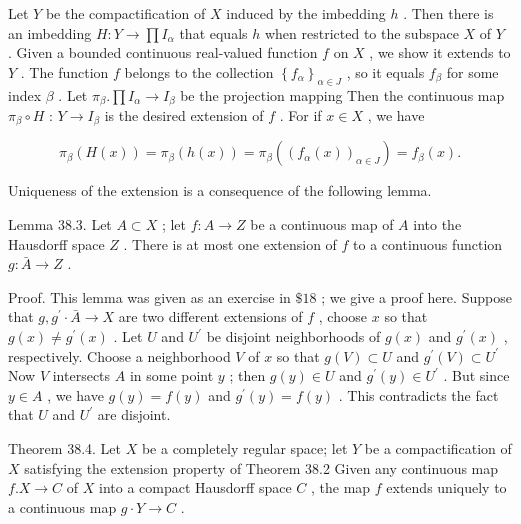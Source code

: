 Let \(Y\) be the compactification of \(X\) induced by the imbedding \(h\) . Then there is an imbedding \(H : Y \rightarrow  \prod {I}_{\alpha }\) that equals \(h\) when restricted to the subspace \(X\) of \(Y\) . Given a bounded continuous real-valued function \(f\) on \(X\) , we show it extends to \(Y\) . The function \(f\) belongs to the collection \({\left\{  {f}_{\alpha }\right\}  }_{\alpha  \in  J}\) , so it equals \({f}_{\beta }\) for some index \(\beta\) . Let \({\pi }_{\beta }.\prod {I}_{\alpha } \rightarrow  {I}_{\beta }\) be the projection mapping Then the continuous map \({\pi }_{\beta } \circ  H\) : \(Y \rightarrow  {I}_{\beta }\) is the desired extension of \(f\) . For if \(x \in  X\) , we have

\[
{\pi }_{\beta }\left( {H\left( x\right) }\right)  = {\pi }_{\beta }\left( {h\left( x\right) }\right)  = {\pi }_{\beta }\left( {\left( {f}_{\alpha }\left( x\right) \right) }_{\alpha  \in  J}\right)  = {f}_{\beta }\left( x\right) .
\]

Uniqueness of the extension is a consequence of the following lemma.

Lemma 38.3. Let \(A \subset  X\) ; let \(f : A \rightarrow  Z\) be a continuous map of \(A\) into the Hausdorff space \(Z\) . There is at most one extension of \(f\) to a continuous function \(g : \bar{A} \rightarrow  Z\) .

Proof. This lemma was given as an exercise in \(\$ {18}\) ; we give a proof here. Suppose that \(g,{g}^{\prime } \cdot  \bar{A} \rightarrow  X\) are two different extensions of \(f\) , choose \(x\) so that \(g\left( x\right)  \neq  {g}^{\prime }\left( x\right)\) . Let \(U\) and \({U}^{\prime }\) be disjoint neighborhoods of \(g\left( x\right)\) and \({g}^{\prime }\left( x\right)\) , respectively. Choose a neighborhood \(V\) of \(x\) so that \(g\left( V\right)  \subset  U\) and \({g}^{\prime }\left( V\right)  \subset  {U}^{\prime }\) Now \(V\) intersects \(A\) in some point \(y\) ; then \(g\left( y\right)  \in  U\) and \({g}^{\prime }\left( y\right)  \in  {U}^{\prime }\) . But since \(y \in  A\) , we have \(g\left( y\right)  = f\left( y\right)\) and \({g}^{\prime }\left( y\right)  = f\left( y\right)\) . This contradicts the fact that \(U\) and \({U}^{\prime }\) are disjoint.

Theorem 38.4. Let \(X\) be a completely regular space; let \(Y\) be a compactification of \(X\) satisfying the extension property of Theorem 38.2 Given any continuous map \(f.X \rightarrow  C\) of \(X\) into a compact Hausdorff space \(C\) , the map \(f\) extends uniquely to a continuous map \(g \cdot  Y \rightarrow  C\) .

